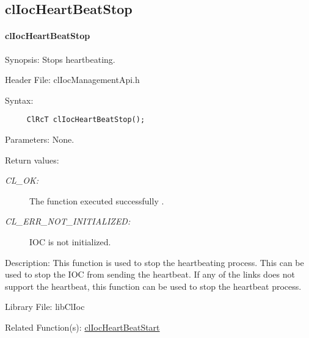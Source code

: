 \begin{flushleft}
\subsection{clIocHeartBeatStop}
\hypertarget{pageioc216}{}\paragraph{cl\-Ioc\-Heart\-Beat\-Stop}\label{pageioc216}
\begin{Desc}
\item[Synopsis:]Stops heartbeating.\end{Desc}
\begin{Desc}
\item[Header File:]clIocManagementApi.h\end{Desc}
\begin{Desc}
\item[Syntax:]

\footnotesize\begin{verbatim}     ClRcT clIocHeartBeatStop();
\end{verbatim}
\normalsize
\end{Desc}
\begin{Desc}
\item[Parameters:]None.\end{Desc}
\begin{Desc}
\item[Return values:]
\begin{description}
\item[{\em CL\_\-OK:}]The function executed successfully . \item[{\em CL\_\-ERR\_\-NOT\_\-INITIALIZED:}]IOC is not initialized.\end{description}
\end{Desc}
\begin{Desc}
\item[Description:]This function is used to stop the heartbeating process. This can be used to stop the IOC from sending the heartbeat. If any of the 
links does not support the heartbeat, this function can be used to stop the heartbeat process.\end{Desc}
\begin{Desc}
\item[Library File:]libClIoc\end{Desc}
\begin{Desc}
\item[Related Function(s):]\hyperlink{pageioc217}{cl\-Ioc\-Heart\-Beat\-Start} \end{Desc}
\newpage




\end{flushleft}
